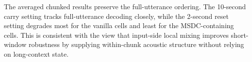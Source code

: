 The averaged chunked results preserve the full-utterance
ordering. The 10-second carry setting tracks full-utterance
decoding closely, while the 2-second reset setting degrades most
for the vanilla cells and least for the MSDC-containing cells.
This is consistent with the view that input-side local mixing
improves short-window robustness by supplying within-chunk
acoustic structure without relying on long-context state.
